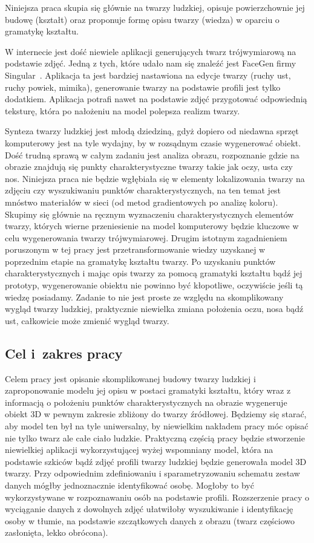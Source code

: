 Niniejsza praca skupia się głównie na twarzy ludzkiej, opisuje powierzchownie
jej budowę (kształt) oraz proponuje formę opisu twarzy (wiedza) w oparciu o
gramatykę kształtu.

W internecie jest dość niewiele aplikacji generujących twarz trójwymiarową na
podstawie zdjęć. Jedną z tych, które udało nam się znaleźć jest FaceGen firmy
Singular~\cite{link04}. Aplikacja ta jest bardziej nastawiona na edycje twarzy
(ruchy ust, ruchy powiek, mimika), generowanie twarzy na podstawie profili
jest tylko dodatkiem. Aplikacja potrafi nawet na podstawie zdjęć przygotować
odpowiednią teksturę, która po nałożeniu na model polepsza realizm twarzy.

Synteza twarzy ludzkiej jest młodą dziedziną, gdyż dopiero od niedawna sprzęt
komputerowy jest na tyle wydajny, by w rozsądnym czasie wygenerować obiekt.
Dość trudną sprawą w całym zadaniu jest analiza obrazu, rozpoznanie gdzie na
obrazie znajdują się punkty charakterystyczne twarzy takie jak oczy, usta czy
nos. Niniejsza praca nie będzie wgłębiała się w elementy lokalizowania
twarzy na zdjęciu czy wyszukiwaniu punktów charakterystycznych, na ten
temat jest mnóstwo materiałów w sieci (od metod gradientowych po analizę
koloru). Skupimy się głównie na ręcznym wyznaczeniu charakterystycznych
elementów twarzy, których wierne przeniesienie na model komputerowy będzie
kluczowe w celu wygenerowania twarzy trójwymiarowej. Drugim istotnym
zagadnieniem poruszonym w tej pracy jest przetransformowanie wiedzy uzyskanej w
poprzednim etapie na gramatykę kształtu twarzy. Po uzyskaniu punktów
charakterystycznych i mając opis twarzy za pomocą gramatyki kształtu bądź jej
prototyp, wygenerowanie obiektu nie powinno być kłopotliwe, oczywiście jeśli tą
wiedzę posiadamy. Zadanie to nie jest proste ze względu na skomplikowany
wygląd twarzy ludzkiej, praktycznie niewielka zmiana położenia oczu, nosa bądź
ust, całkowicie może zmienić wygląd twarzy.

\subsection{Cel i~zakres pracy}
Celem pracy jest opisanie skomplikowanej budowy twarzy ludzkiej i zaproponowanie
modelu jej opisu w postaci gramatyki kształtu, który wraz z informacją o
położeniu punktów charakterystycznych na obrazie wygeneruje obiekt 3D w pewnym
zakresie zbliżony do twarzy źródłowej. Będziemy się starać, aby model ten był na
tyle uniwersalny, by niewielkim nakładem pracy móc opisać nie tylko
twarz ale całe ciało ludzkie. Praktyczną częścią pracy będzie stworzenie
niewielkiej aplikacji wykorzystującej wyżej wspomniany model, która na
podstawie szkiców bądź zdjęć profili twarzy ludzkiej będzie generowała model 3D
twarzy. Przy odpowiednim zdefiniowaniu i sparametryzowaniu schematu zestaw
danych mógłby jednoznacznie identyfikować osobę. Mogłoby to być wykorzystywane w
rozpoznawaniu osób na podstawie profili. Rozszerzenie pracy o wyciąganie danych
z dowolnych zdjęć ułatwiłoby wyszukiwanie i identyfikację osoby w tłumie, na
podstawie szczątkowych danych z obrazu (twarz częściowo zasłonięta, lekko
obrócona).

